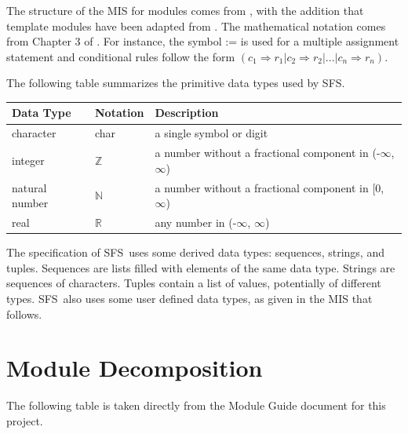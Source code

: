 \documentclass[12pt, titlepage]{article}
\newcommand{\progname}{SFS}
\begin{document}
The structure of the MIS for modules comes from \citet{HoffmanAndStrooper1995},
with the addition that template modules have been adapted from
\cite{GhezziEtAl2003}.  The mathematical notation comes from Chapter 3 of
\citet{HoffmanAndStrooper1995}.  For instance, the symbol := is used for a
multiple assignment statement and conditional rules follow the form
$(c_1 \Rightarrow r_1 | c_2 \Rightarrow r_2 | ... | c_n \Rightarrow r_n )$.

The following table summarizes the primitive data types used by \progname. 

\begin{center}
\renewcommand{\arraystretch}{1.2}
\noindent 
\begin{tabular}{l l p{7.5cm}} 
  \toprule 
  \textbf{Data Type} & \textbf{Notation} & \textbf{Description}\\ 
  \midrule
  character & char & a single symbol or digit\\
  integer & $\mathbb{Z}$ & a number without a fractional component in (-$\infty$, $\infty$) \\
  natural number & $\mathbb{N}$ & a number without a fractional component in [0, $\infty$) \\
  real & $\mathbb{R}$ & any number in (-$\infty$, $\infty$)\\
  \bottomrule
\end{tabular} 
\end{center}

\noindent
The specification of \progname \ uses some derived data types: sequences,
strings, and tuples. Sequences are lists filled with elements of the same data
type. Strings are sequences of characters. Tuples contain a list of values,
potentially of different types.  \progname \ also uses some user defined data
types, as given in the MIS that follows.

\section{Module Decomposition}

The following table is taken directly from the Module Guide document for this
project.  
\end{document}
